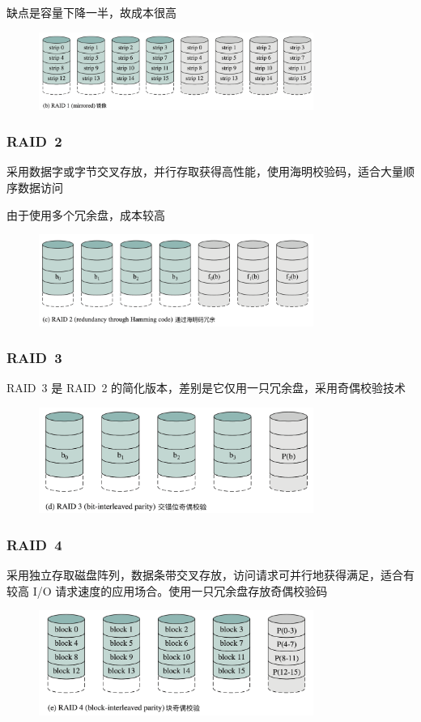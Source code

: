 \documentclass[cs4size,a4paper,10pt]{ctexart}
\begin{document}
	缺点是容量下降一半，故成本很高
	\begin{figure}[H]
		\centering
		\includegraphics[width=0.8\textwidth]{img/RAID1}
	\end{figure}

	\subsubsection{RAID\ 2}
	采用数据字或字节交叉存放，并行存取获得高性能，使用海明校验码，适合大量顺序数据访问

	由于使用多个冗余盘，成本较高
	\begin{figure}[H]
		\centering
		\includegraphics[width=0.8\textwidth]{img/RAID2}
	\end{figure}

	\subsubsection{RAID\ 3}
	RAID\ 3 是 RAID\ 2 的简化版本，差别是它仅用一只冗余盘，采用奇偶校验技术
	\begin{figure}[H]
		\centering
		\includegraphics[width=0.8\textwidth]{img/RAID3}
	\end{figure}

	\subsubsection{RAID\ 4}
	采用独立存取磁盘阵列，数据条带交叉存放，访问请求可并行地获得满足，适合有较高 I/O 请求速度的应用场合。使用一只冗余盘存放奇偶校验码
	\begin{figure}[H]
		\centering
		\includegraphics[width=0.8\textwidth]{img/RAID4}
	\end{figure}
\end{document}
